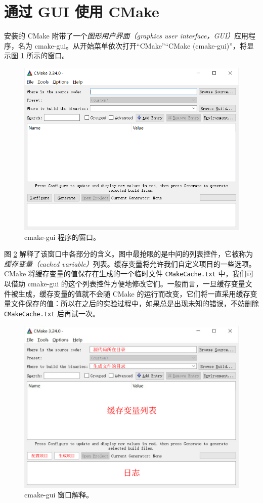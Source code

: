 
\section{通过 GUI 使用 CMake}

安装的 CMake 附带了一个\emph{图形用户界面（graphics user interface，GUI）}应用程序，名为 cmake-gui。从开始菜单依次打开“CMake”“CMake (cmake-gui)”，将显示图 \ref{fig:cmake-gui-1} 所示的窗口。

\begin{figure}[H]
	\centering
	\includegraphics[width=0.75\linewidth]{assets/cmake-gui-1}
	\caption{cmake-gui 程序的窗口。}
	\label{fig:cmake-gui-1}
\end{figure}

图 \ref{fig:cmake-gui-2} 解释了该窗口中各部分的含义。图中最抢眼的是中间的列表控件，它被称为\emph{缓存变量（cached variable）}列表。缓存变量将允许我们自定义项目的一些选项。CMake 将缓存变量的值保存在生成的一个临时文件 \lstinline[language={}]{CMakeCache.txt} 中，我们可以借助 cmake-gui 的这个列表控件方便地修改它们。一般而言，一旦缓存变量文件被生成，缓存变量的值就不会随 CMake 的运行而改变，它们将一直采用缓存变量文件保存的值：所以在之后的实验过程中，如果总是出现未知的错误，不妨删除 \lstinline[language={}]{CMakeCache.txt} 后再试一次。

\begin{figure}[H]
	\centering
	\includegraphics[width=0.75\linewidth]{assets/cmake-gui-2}
	\caption{cmake-gui 窗口解释。}
	\label{fig:cmake-gui-2}
\end{figure}

